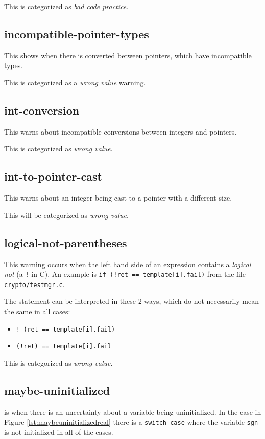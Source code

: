 \documentclass[a4paper,11pt]{report}
\newcommand{\textcode}[1]{\fboxsep=1pt\texttt{\colorbox{gray!20}{#1}}}
\begin{document}
This is categorized as \emph{bad code practice}.


            \subsection*{incompatible-pointer-types}
This shows when there is converted between pointers, which have incompatible 
types.

This is categorized as a \emph{wrong value} warning.


            \subsection*{int-conversion}
This warns about incompatible conversions between integers and pointers.

This is categorized as \emph{wrong value}.

            \subsection*{int-to-pointer-cast}
This warns about an integer being cast to a pointer with a different size.

This will be categorized as \emph{wrong value}.


            \subsection*{logical-not-parentheses}
This warning occurs when the left hand side of an expression contains a 
\emph{logical not} (a \texttt{!} in C). An example is 
    \textcode{if (!ret == template[i].fail)} 
from the file \texttt{crypto/testmgr.c}.

The statement can be interpreted in these 2 ways, which do not necessarily mean 
the same in all cases:

\begin{itemize}
    \item \textcode{!\ (ret == template[i].fail)} 
    \item \textcode{(!ret) == template[i].fail}
\end{itemize}

This is categorized as \emph{wrong value}.


            \subsection*{maybe-uninitialized}
is when there is an uncertainty about a variable being uninitialized. In the 
case in Figure \ref{lst:maybeuninitializedreal} there is a \texttt{switch-case} 
where the variable \textcode{sgn} is not initialized in all of the cases.
\end{document}
